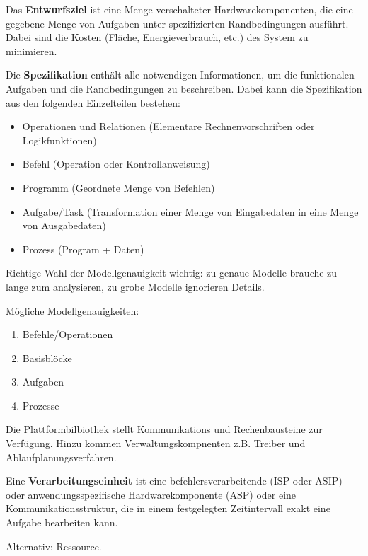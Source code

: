 \begin{tcolorbox}
    Das \textbf{Entwurfsziel} ist eine Menge verschalteter Hardwarekomponenten, die eine
    gegebene Menge von Aufgaben unter spezifizierten Randbedingungen ausführt. Dabei sind
    die Kosten (Fläche, Energieverbrauch, etc.) des System zu minimieren.
\end{tcolorbox}

\begin{tcolorbox}
    Die \textbf{Spezifikation} enthält alle notwendigen Informationen, um die
    funktionalen Aufgaben und die Randbedingungen zu beschreiben. Dabei kann die
    Spezifikation aus den folgenden Einzelteilen bestehen:
    \begin{itemize}
        \item Operationen und Relationen (Elementare Rechnenvorschriften oder Logikfunktionen)
        \item Befehl (Operation oder Kontrollanweisung)
        \item Programm (Geordnete Menge von Befehlen)
        \item Aufgabe/Task (Transformation einer Menge von Eingabedaten in eine Menge
            von Ausgabedaten)
        \item Prozess (Program + Daten)
    \end{itemize}
\end{tcolorbox}

Richtige Wahl der Modellgenauigkeit wichtig: 
zu genaue Modelle brauche zu lange zum analysieren, zu grobe Modelle ignorieren Details.

Mögliche Modellgenauigkeiten:
\begin{enumerate}
    \item Befehle/Operationen
    \item Basisblöcke
    \item Aufgaben
    \item Prozesse
\end{enumerate}

Die Plattformbilbiothek stellt Kommunikations und Rechenbausteine zur Verfügung. Hinzu
kommen Verwaltungskompnenten z.B. Treiber und Ablaufplanungsverfahren.

\begin{tcolorbox}
    Eine \textbf{Verarbeitungseinheit} ist eine befehlersverarbeitende (ISP oder ASIP)
    oder anwendungsspezifische Hardwarekomponente (ASP) oder eine Kommunikationsstruktur,
    die in einem festgelegten Zeitintervall exakt eine Aufgabe bearbeiten kann.

    Alternativ: Ressource.
\end{tcolorbox}


